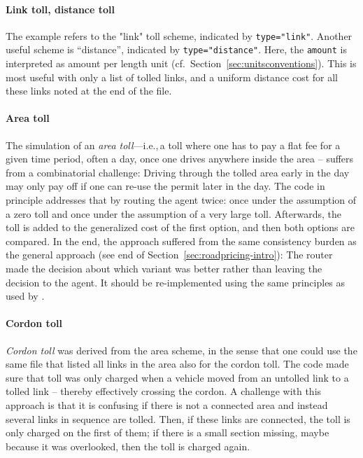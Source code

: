 \paragraph{Link toll, distance toll} The example refers to the "link" toll scheme, indicated by \lstinline$type="link"$. Another useful scheme is ``distance'', indicated by \lstinline$type="distance"$.  Here, the \lstinline$amount$ is interpreted as amount per length unit (cf.\ Section~\ref{sec:unitsconventions}).   This is most useful with only a list of tolled links, and a uniform distance cost for all these links noted at the end of the file.

\paragraph{Area toll} The simulation of an \emph{area toll}---i.e.,\,a toll where one has to pay a flat fee for a given time period, often a day, once one drives anywhere inside the area -- suffers from a combinatorial challenge: Driving through the tolled area early in the day may only pay off if one can re-use the permit later in the day.  The code in principle addresses that by routing the agent twice: once under the assumption of a zero toll and once under the assumption of a very large toll.  Afterwards, the toll is added to the generalized cost of the first option, and then both options are compared.  
%
In the end, the approach suffered from the same consistency burden as the general approach (see end of Section~\ref{sec:roadpricing-intro}): The router made the decision about which variant was better rather than leaving the decision to the agent. It should be re-implemented using the same principles as used by \citet{NagelEtAl_PCS_2014}.

\paragraph{Cordon toll}

\emph{Cordon toll} was derived from the area scheme, in the sense that one could use the same file that listed all links in the area also for the cordon toll.  The code made sure that toll was only charged when a vehicle moved from an untolled link to a tolled link -- thereby effectively crossing the cordon.  A challenge with this approach is that it is confusing if there is not a connected area and instead several links in sequence are tolled.  Then, if these links are connected, the toll is only charged on the first of them; if there is a small section missing, maybe because it was overlooked, then the toll is charged again. 


